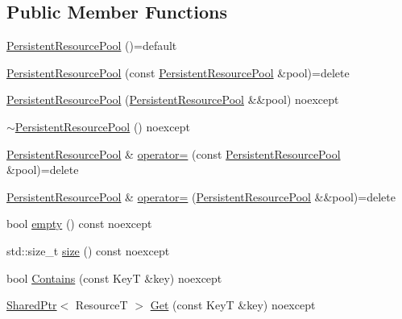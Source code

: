 \subsection*{Public Member Functions}
\begin{DoxyCompactItemize}
\item 
\mbox{\hyperlink{classmage_1_1_persistent_resource_pool_a23b83adf594628b93c368a2da7660ef8}{Persistent\+Resource\+Pool}} ()=default
\item 
\mbox{\hyperlink{classmage_1_1_persistent_resource_pool_af49749cabca4e6e16b2c073f6f550e0b}{Persistent\+Resource\+Pool}} (const \mbox{\hyperlink{classmage_1_1_persistent_resource_pool}{Persistent\+Resource\+Pool}} \&pool)=delete
\item 
\mbox{\hyperlink{classmage_1_1_persistent_resource_pool_acf26c05e2e6031720fa92fb0cec0d398}{Persistent\+Resource\+Pool}} (\mbox{\hyperlink{classmage_1_1_persistent_resource_pool}{Persistent\+Resource\+Pool}} \&\&pool) noexcept
\item 
\mbox{\hyperlink{classmage_1_1_persistent_resource_pool_a13bb68c8a9f8c37f9f217aea2625935a}{$\sim$\+Persistent\+Resource\+Pool}} () noexcept
\item 
\mbox{\hyperlink{classmage_1_1_persistent_resource_pool}{Persistent\+Resource\+Pool}} \& \mbox{\hyperlink{classmage_1_1_persistent_resource_pool_a796e9dbb12e2756412c50117a6a67f86}{operator=}} (const \mbox{\hyperlink{classmage_1_1_persistent_resource_pool}{Persistent\+Resource\+Pool}} \&pool)=delete
\item 
\mbox{\hyperlink{classmage_1_1_persistent_resource_pool}{Persistent\+Resource\+Pool}} \& \mbox{\hyperlink{classmage_1_1_persistent_resource_pool_adcec8a286b15174ee99200b68ba0589e}{operator=}} (\mbox{\hyperlink{classmage_1_1_persistent_resource_pool}{Persistent\+Resource\+Pool}} \&\&pool)=delete
\item 
bool \mbox{\hyperlink{classmage_1_1_persistent_resource_pool_a9a5669551c15823b817b3c4716a5a52c}{empty}} () const noexcept
\item 
std\+::size\+\_\+t \mbox{\hyperlink{classmage_1_1_persistent_resource_pool_a786d243e24879b8cbd62c7f902b3a41b}{size}} () const noexcept
\item 
bool \mbox{\hyperlink{classmage_1_1_persistent_resource_pool_a92af0c4a200ea217b831d89cfc321557}{Contains}} (const KeyT \&key) noexcept
\item 
\mbox{\hyperlink{namespacemage_a1e01ae66713838a7a67d30e44c67703e}{Shared\+Ptr}}$<$ ResourceT $>$ \mbox{\hyperlink{classmage_1_1_persistent_resource_pool_ad8d5e096f7f9f0446993b83fe1767fd3}{Get}} (const KeyT \&key) noexcept

\end{DoxyCompactItemize}
